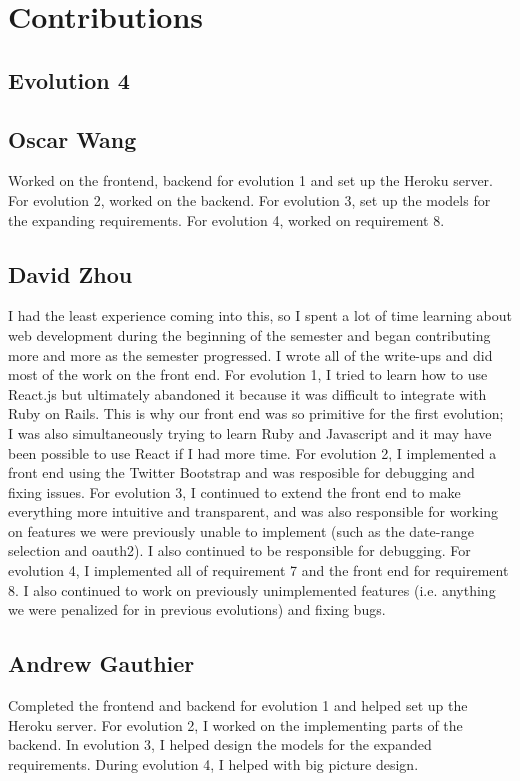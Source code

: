 \documentclass{article}
\begin{document}
\section{Contributions}
\subsection{Evolution 4}
\subsection{Oscar Wang}
Worked on the frontend, backend for evolution 1 and set up the Heroku server. For evolution 2, worked on the backend. For evolution 3, set up the models for the expanding requirements. For evolution 4, worked on requirement 8.
\subsection{David Zhou}
I had the least experience coming into this, so I spent a lot of time learning about web development during the beginning of the semester and began contributing more and more as the semester progressed.  I wrote all of the write-ups and did most of the work on the front end.  For evolution 1, I tried to learn how to use React.js but ultimately abandoned it because it was difficult to integrate with Ruby on Rails.  This is why our front end was so primitive for the first evolution; I was also simultaneously trying to learn Ruby and Javascript and it may have been possible to use React if I had more time.  For evolution 2, I implemented a front end using the Twitter Bootstrap and was resposible for debugging and fixing issues.  For evolution 3, I continued to extend the front end to make everything more intuitive and transparent, and was also responsible for working on features we were previously unable to implement (such as the date-range selection and oauth2).  I also continued to be responsible for debugging.  For evolution 4, I implemented all of requirement 7 and the front end for requirement 8. I also continued to work on previously unimplemented features (i.e. anything we were penalized for in previous evolutions) and fixing bugs.
\subsection{Andrew Gauthier}
Completed the frontend and backend for evolution 1 and helped set up the Heroku server. For evolution 2, I worked on the implementing parts of the backend. In evolution 3, I helped design the models for the expanded requirements. During evolution 4, I helped with big picture design.
\end{document}
